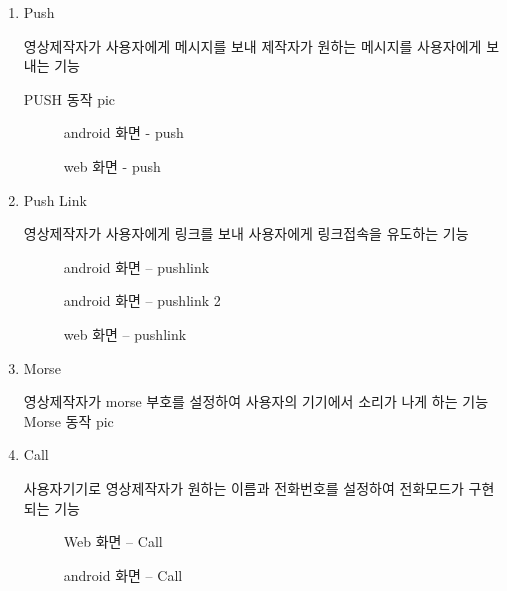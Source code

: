 \begin{enumerate}

    \item  Push 

    영상제작자가 사용자에게 메시지를 보내 제작자가 원하는 메시지를 사용자에게 보내는 기능

    PUSH 동작 pic

    \begin{figure}[h!]
    \centering
    \caption{android 화면 - push}
    \end{figure}
    \begin{figure}[h!]
    \centering
    \caption{web 화면 - push}
    \end{figure}

    \item  Push Link 

    영상제작자가 사용자에게 링크를 보내 사용자에게 링크접속을 유도하는 기능

    \begin{figure}[h!]
    \centering
    \caption{android 화면 – pushlink}
    \end{figure}

    \begin{figure}[h!]
    \centering
    \caption{android 화면 – pushlink 2}
    \end{figure}

    \begin{figure}[h!]
    \centering
    \caption{web 화면 – pushlink}
    \end{figure}

    \item  Morse

    영상제작자가 morse 부호를 설정하여 사용자의 기기에서 소리가 나게 하는 기능
    Morse 동작 pic

    \item  Call 

    사용자기기로 영상제작자가 원하는 이름과 전화번호를 설정하여 전화모드가 구현되는 기능

    \begin{figure}[h!]
    \centering
    \caption{Web 화면 – Call}
    \end{figure}


    \begin{figure}[h!]
    \centering
    \caption{android 화면 – Call}
    \end{figure}



\end{enumerate}

